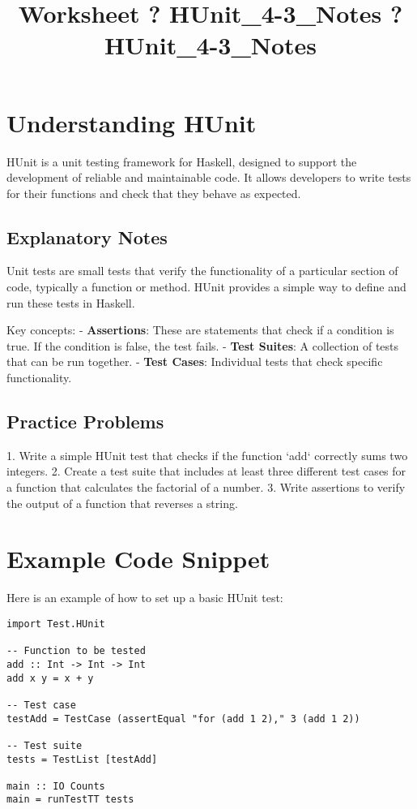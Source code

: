 \documentclass{article}
\title{Worksheet ? HUnit_4-3_Notes ? HUnit_4-3_Notes}
\author{}
\date{}
\begin{document}
\maketitle

\section*{Understanding HUnit}
HUnit is a unit testing framework for Haskell, designed to support the development of reliable and maintainable code. It allows developers to write tests for their functions and check that they behave as expected.

\subsection*{Explanatory Notes}
Unit tests are small tests that verify the functionality of a particular section of code, typically a function or method. HUnit provides a simple way to define and run these tests in Haskell.

Key concepts:
- \textbf{Assertions}: These are statements that check if a condition is true. If the condition is false, the test fails.
- \textbf{Test Suites}: A collection of tests that can be run together.
- \textbf{Test Cases}: Individual tests that check specific functionality.

\subsection*{Practice Problems}
1. Write a simple HUnit test that checks if the function `add` correctly sums two integers.
2. Create a test suite that includes at least three different test cases for a function that calculates the factorial of a number.
3. Write assertions to verify the output of a function that reverses a string.

\section*{Example Code Snippet}
Here is an example of how to set up a basic HUnit test:

\begin{verbatim}
import Test.HUnit

-- Function to be tested
add :: Int -> Int -> Int
add x y = x + y

-- Test case
testAdd = TestCase (assertEqual "for (add 1 2)," 3 (add 1 2))

-- Test suite
tests = TestList [testAdd]

main :: IO Counts
main = runTestTT tests
\end{verbatim}
\end{document}
